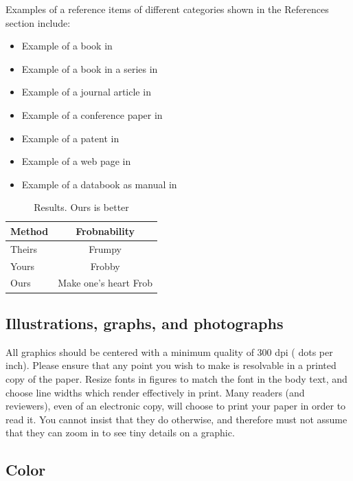 Examples of a reference items of different categories shown in the References section include:
\begin{itemize}
\item Example of a book in~\cite{b4}
\item Example of a book in a series in~\cite{b9}
\item Example of a journal article in~\cite{b1}
\item Example of a conference paper in~\cite{b7}
\item Example of a patent in~\cite{b8}
\item Example of a web page in~\cite{b6}
\item Example of a databook as manual in~\cite{b5}
\end{itemize}

\begin{table}[ht]
\centering
\caption{Results. Ours is better}
\label{tab:comparison}
\begin{tabular}{|l|c|}
\hline
Method & Frobnability \\ \hline
Theirs & Frumpy \\ \hline
Yours & Frobby \\ \hline
Ours & Make one’s heart Frob \\ \hline
\end{tabular}
\end{table}
\subsection{Illustrations, graphs, and photographs}

All graphics should be centered with a minimum quality of 300 dpi ( dots per inch).  Please ensure that any point you wish to make is resolvable in a printed copy of the paper.  Resize fonts in figures to match the font in the body text, and choose line widths which render effectively in print.  Many readers (and reviewers), even of an electronic copy, will choose to print your paper in order to read it.  You cannot insist that they do otherwise, and therefore must not assume that they can zoom in to see tiny details on a graphic.

\subsection{Color}

